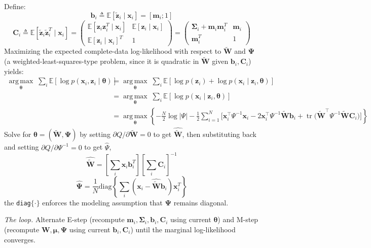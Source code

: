\documentclass[11pt]{article}
\begin{document}
Define:
\[
\mathbf{b}_i \triangleq \mathbb{E}[\tilde{\mathbf{z}}_i\mid\mathbf{x}_i] = [\mathbf{m}_i;1]
\]
\[
\mathbf{C}_i \triangleq \mathbb{E}[\tilde{\mathbf{z}}_i\tilde{\mathbf{z}}_i^T\mid\mathbf{x}_i] = \begin{pmatrix}\mathbb{E}[\mathbf{z}_i\mathbf{z}_i^T\mid\mathbf{x}_i] & \mathbb{E}[\mathbf{z}_i\mid\mathbf{x}_i] \\ \mathbb{E}[\mathbf{z}_i\mid\mathbf{x}_i]^T & 1\end{pmatrix} = \begin{pmatrix}\boldsymbol{\Sigma}_i + \mathbf{m}_i\mathbf{m}_i^T & \mathbf{m}_i \\ \mathbf{m}_i^T & 1\end{pmatrix}
\]
Maximizing the expected complete-data log-likelihood with respect to $\tilde{\mathbf{W}}$ and $\boldsymbol{\Psi}$ (a weighted-least-squares-type problem, since it is quadratic in $\tilde{\mathbf{W}}$ given $\mathbf{b}_i,\mathbf{C}_i$) yields:
\[
\begin{aligned}
\operatorname*{arg\,max}_{\boldsymbol{\theta}} \; \sum_i\mathbb{E}[\log p(\mathbf{x}_i, \mathbf{z}_i \mid \boldsymbol{\theta})] &=\operatorname*{arg\,max}_{\boldsymbol{\theta}} \; \sum_i\mathbb{E}[ \log p(\mathbf{z}_i) + \log p(\mathbf{x}_i \mid \mathbf{z}_i, \boldsymbol{\theta}) ] \\
&= \operatorname*{arg\,max}_{\boldsymbol{\theta}} \; \sum_i\mathbb{E}[ \log p(\mathbf{x}_i \mid \mathbf{z}_i, \boldsymbol{\theta}) ] \\
&= \operatorname*{arg\,max}_{\boldsymbol{\theta}} \left\{ -\frac{N}{2}\log|\Psi| - \frac{1}{2}\sum_{i=1}^N\Big[\mathbf{x}_i^\top\Psi^{-1}\mathbf{x}_i - 2\mathbf{x}_i^\top\Psi^{-1}\tilde{\mathbf{W}}\boldsymbol{b}_i + \operatorname{tr}\big(\tilde{\mathbf{W}}^\top\Psi^{-1}\tilde{\mathbf{W}}\mathbf{C}_i\big)\Big] \right\}
\end{aligned}
\]
Solve for $\boldsymbol{\theta}=(\tilde{\mathbf{W}},\boldsymbol{\Psi})$ by setting $\partial Q/\partial\tilde{\mathbf{W}}=0$ to get $\hat{\tilde{\mathbf{W}}}$, then substituting back and setting $\partial Q/\partial\Psi^{-1}=0$ to get $\hat{\Psi}$,
\[
\hat{\tilde{\mathbf{W}}} = \left[\sum_i \mathbf{x}_i\mathbf{b}_i^T\right]\left[\sum_i \mathbf{C}_i\right]^{-1}
\]
\[
\hat{\boldsymbol{\Psi}} = \frac{1}{N}\mathrm{diag}\left\{\sum_i\left(\mathbf{x}_i-\hat{\tilde{\mathbf{W}}}\mathbf{b}_i\right)\mathbf{x}_i^T\right\}
\]
the \texttt{diag}$\{\cdot\}$ enforces the modeling assumption that $\boldsymbol{\Psi}$ remains diagonal.

\textit{The loop.} Alternate E-step (recompute $\mathbf{m}_i,\boldsymbol{\Sigma}_i,\mathbf{b}_i,\mathbf{C}_i$ using current $\boldsymbol{\theta}$) and M-step (recompute $\mathbf{W},\boldsymbol{\mu},\boldsymbol{\Psi}$ using current $\mathbf{b}_i,\mathbf{C}_i$) until the marginal log-likelihood converges.
\end{document}
